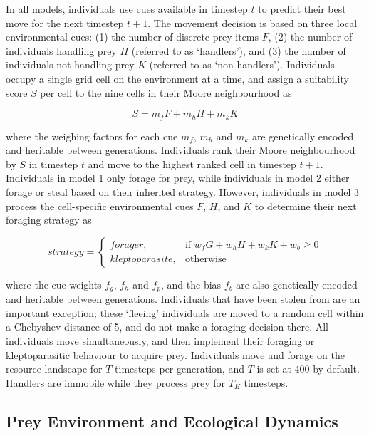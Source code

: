 \documentclass[11pt]{article}
\begin{document}
In all models, individuals use cues available in timestep $t$ to predict their best move for the next timestep $t+1$.
The movement decision is based on three local environmental cues: (1) the number of discrete prey items $F$, (2) the number of individuals handling  prey $H$ (referred to as `handlers'), and (3) the number of individuals not handling prey $K$ (referred to as `non-handlers').
Individuals occupy a single grid cell on the environment at a time, and assign a suitability score $S$ per cell to the nine cells in their Moore neighbourhood as
\begin{linenomath*}
    \begin{equation}
        S = m_fF + m_hH + m_kK
    \end{equation}
\end{linenomath*}
where the weighing factors for each cue $m_f$, $m_h$ and $m_k$ are genetically encoded and heritable between generations.
Individuals rank their Moore neighbourhood by $S$ in timestep $t$ and move to the highest ranked cell in timestep $t+1$.
Individuals in model 1 only forage for prey, while individuals in model 2 either forage or steal based on their inherited strategy.
However, individuals in model 3 process the cell-specific environmental cues $F$, $H$, and $K$ to determine their next foraging strategy as
\begin{linenomath*}
    \begin{equation}
        strategy = 
    \begin{cases}
        {forager},& \text{if } w_fG + w_hH + w_kK + w_b \geq 0\\
        {kleptoparasite},              & \text{otherwise}
    \end{cases}
    \end{equation}
\end{linenomath*}
where the cue weights $f_g$, $f_h$ and $f_p$, and the bias $f_b$ are also genetically encoded and heritable between generations.
Individuals that have been stolen from are an important exception; these `fleeing' individuals are moved to a random cell within a Chebyshev distance of 5, and do not make a foraging decision there.
All individuals move simultaneously, and then implement their foraging or kleptoparasitic behaviour to acquire prey.
Individuals move and forage on the resource landscape for $T$ timesteps per generation, and $T$ is set at 400 by default. 
Handlers are immobile while they process prey for $T_H$ timesteps.

\subsection{Prey Environment and Ecological Dynamics}
\end{document}
